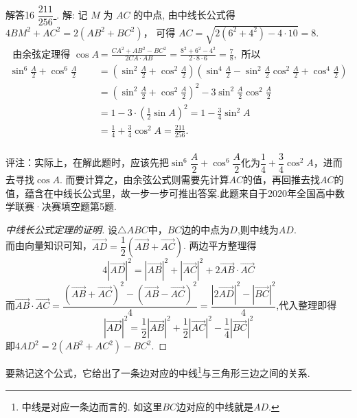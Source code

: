 \documentclass[11pt]{article}
\begin{document}
\begin{compactdesc}
	\item [解答16] \underline{ $ \dfrac{211}{256} $ }. 
	解: 记 $M$ 为 $A C$ 的中点, 由中线长公式得$
	4 B M^{2}+A C^{2}=2\left(A B^{2}+B C^{2}\right)$，
	可得 $A C=\sqrt{2\left(6^{2}+4^{2}\right)-4 \cdot 10}=8$.
	$$
	\begin{aligned}
		\text { 由余弦定理得 } \cos A &=\frac{C A^{2}+A B^{2}-B C^{2}}{2 C A \cdot A B}=\frac{8^{2}+6^{2}-4^{2}}{2 \cdot 8 \cdot 6}=\frac{7}{8}, \text { 所以 } \\
		\sin ^{6} \frac{A}{2}+\cos ^{6} \frac{A}{2} &=\left(\sin ^{2} \frac{A}{2}+\cos ^{2} \frac{A}{2}\right)\left(\sin ^{4} \frac{A}{2}-\sin ^{2} \frac{A}{2} \cos ^{2} \frac{A}{2}+\cos ^{4} \frac{A}{2}\right) \\
		&=\left(\sin ^{2} \frac{A}{2}+\cos ^{2} \frac{A}{2}\right)^{2}-3 \sin ^{2} \frac{A}{2} \cos ^{2} \frac{A}{2} \\
		&=1-3\cdot \left ( \frac{1}{2} \sin A \right ) ^2=1- \frac{3}{4} \sin ^{2} A \\
		&=\frac{1}{4}+\frac{3}{4} \cos ^{2} A=\frac{211}{256} .
	\end{aligned}
	$$
	\\ \heiti 评注：\songti 实际上，在解此题时，应该先把$ \sin ^{6} \dfrac{A}{2}+\cos ^{6} \dfrac{A}{2} $化为$ \dfrac{1}{4}+\dfrac{3}{4} \cos ^{2} A $，进而去寻找$ \cos A$. 而要计算之，由余弦公式则需要先计算$AC$的值，再回推去找$AC$的值，蕴含在中线长公式里，故一步一步可推出答案.此题来自于2020年全国高中数学联赛·决赛填空题第5题. 
	\begin{proof}[\heiti 中线长公式定理的证明]
		设$ \triangle ABC $中，$BC$边的中点为$D$,则中线为$AD$.
		\\而由向量知识可知，$ \overrightarrow{AD}=\dfrac{1}{2}\left ( \overrightarrow{AB}+\overrightarrow{AC}   \right ) $. 两边平方整理得
		$$ 4\left | \overrightarrow{AD} \right |^2 =
		\left | \overrightarrow{AB} \right |^2 +\left | \overrightarrow{AC}  \right |^2
		+2 \overrightarrow{AB}\cdot \overrightarrow{AC} $$
		而$ \overrightarrow{AB}\cdot \overrightarrow{AC}=
		\dfrac{\left ( \overrightarrow{AB}+\overrightarrow{AC} \right )^2-\left ( \overrightarrow{AB}-\overrightarrow{AC} \right )^2}{4}
		=\dfrac{\left |2 \overrightarrow{AD}\right |^2-\left | \overrightarrow{BC} \right |^2}{4}   $,代入整理即得
		$$
		\left | \overrightarrow{AD}  \right |^2
		=\dfrac{1}{2}  \left | \overrightarrow{AB}  \right |^2
		+\dfrac{1}{2}  \left | \overrightarrow{AC}  \right |^2
		-\dfrac{1}{4}  \left | \overrightarrow{BC}  \right |^2
		$$
		即$ 4AD^2=2(AB^2+AC^2)-BC^2 $.
	\end{proof}	
	要熟记这个公式，它给出了\heiti 一条边对应的中线\footnote{中线是对应一条边而言的. 如这里$BC$边对应的中线就是$AD$.}\songti 与三角形三边之间的关系.
\end{compactdesc}
\end{document}
